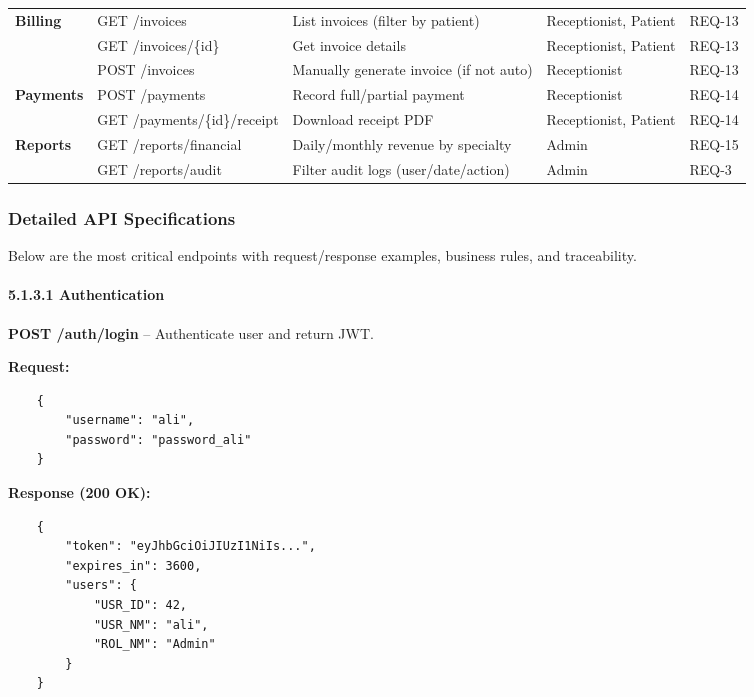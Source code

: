 \begin{longtable}{%
		p{}
		p{}
		p{}
		p{}
		p{}}
	\textbf{Billing}
	& GET /invoices             & List invoices (filter by patient) & Receptionist, Patient & REQ-13 \\[8pt]
	& GET /invoices/\{id\}      & Get invoice details               & Receptionist, Patient & REQ-13 \\[8pt]
	& POST /invoices            & Manually generate invoice (if not auto) & Receptionist & REQ-13 \\[10pt]
	
	\textbf{Payments}
	& POST /payments            & Record full/partial payment       & Receptionist & REQ-14 \\[8pt]
	& GET /payments/\{id\}/receipt & Download receipt PDF           & Receptionist, Patient & REQ-14 \\[10pt]
	
	\textbf{Reports}
	& GET /reports/financial    & Daily/monthly revenue by specialty & Admin & REQ-15 \\[8pt]
	& GET /reports/audit        & Filter audit logs (user/date/action) & Admin & REQ-3 \\
	
	\bottomrule
\end{longtable}

\subsubsection{Detailed API Specifications}

Below are the most critical endpoints with request/response examples, business rules, and traceability.

\paragraph{5.1.3.1 \quad Authentication}

\textbf{POST /auth/login} – Authenticate user and return JWT.

\textbf{Request:}
\begin{verbatim}
	{
		"username": "ali",
		"password": "password_ali"
	}
\end{verbatim}

\textbf{Response (200 OK):}
\begin{verbatim}
	{
		"token": "eyJhbGciOiJIUzI1NiIs...",
		"expires_in": 3600,
		"users": {
			"USR_ID": 42,
			"USR_NM": "ali",
			"ROL_NM": "Admin"
		}
	}
\end{verbatim}

